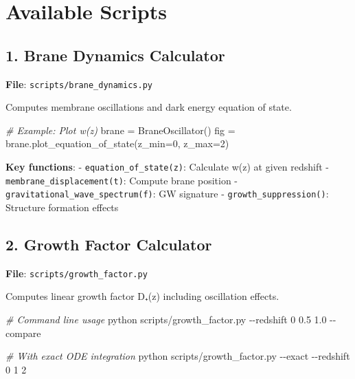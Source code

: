 \documentclass[
  11pt,
]{report}
\newenvironment{Shaded}{}{}
\newcommand{\AttributeTok}[1]{\textcolor[rgb]{0.49,0.56,0.16}{#1}}
\newcommand{\CommentTok}[1]{\textcolor[rgb]{0.38,0.63,0.69}{\textit{#1}}}
\newcommand{\DecValTok}[1]{\textcolor[rgb]{0.25,0.63,0.44}{#1}}
\newcommand{\ExtensionTok}[1]{#1}
\newcommand{\NormalTok}[1]{#1}
\newcommand{\OperatorTok}[1]{\textcolor[rgb]{0.40,0.40,0.40}{#1}}
\begin{document}
\section{Available Scripts}\label{available-scripts}

\subsection{1. Brane Dynamics
Calculator}\label{brane-dynamics-calculator}

\textbf{File}: \texttt{scripts/brane\_dynamics.py}

Computes membrane oscillations and dark energy equation of state.

\begin{Shaded}
\begin{Highlighting}[]
\CommentTok{\# Example: Plot w(z)}
\NormalTok{brane }\OperatorTok{=}\NormalTok{ BraneOscillator()}
\NormalTok{fig }\OperatorTok{=}\NormalTok{ brane.plot\_equation\_of\_state(z\_min}\OperatorTok{=}\DecValTok{0}\NormalTok{, z\_max}\OperatorTok{=}\DecValTok{2}\NormalTok{)}
\end{Highlighting}
\end{Shaded}

\textbf{Key functions}: - \texttt{equation\_of\_state(z)}: Calculate
w(z) at given redshift - \texttt{membrane\_displacement(t)}: Compute
brane position - \texttt{gravitational\_wave\_spectrum(f)}: GW signature
- \texttt{growth\_suppression()}: Structure formation effects

\subsection{2. Growth Factor Calculator}\label{growth-factor-calculator}

\textbf{File}: \texttt{scripts/growth\_factor.py}

Computes linear growth factor D₊(z) including oscillation effects.

\begin{Shaded}
\begin{Highlighting}[]
\CommentTok{\# Command line usage}
\ExtensionTok{python}\NormalTok{ scripts/growth\_factor.py }\AttributeTok{{-}{-}redshift}\NormalTok{ 0 0.5 1.0 }\AttributeTok{{-}{-}compare}

\CommentTok{\# With exact ODE integration}
\ExtensionTok{python}\NormalTok{ scripts/growth\_factor.py }\AttributeTok{{-}{-}exact} \AttributeTok{{-}{-}redshift}\NormalTok{ 0 1 2}
\end{Highlighting}
\end{Shaded}
\end{document}
